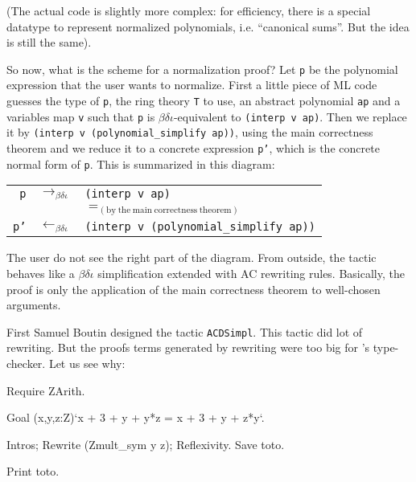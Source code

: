 (The actual code is slightly more complex: for efficiency,
there is a special datatype to represent normalized polynomials,
i.e. ``canonical sums''. But the idea is still the same).

So now, what is the scheme for a normalization proof? Let \texttt{p}
be the polynomial expression that the user wants to normalize. First a
little piece of ML code guesses the type of \texttt{p}, the ring
theory \texttt{T} to use, an abstract polynomial \texttt{ap} and a
variables map \texttt{v} such that \texttt{p} is
$\beta\delta\iota$-equivalent to \verb|(interp v ap)|. Then we
replace it by \verb|(interp v (polynomial_simplify ap))|, using the
main correctness theorem and we reduce it to a concrete expression
\texttt{p'}, which is the concrete normal form of
\texttt{p}. This is summarized in this diagram:

\medskip
\begin{tabular}{rcl}
\texttt{p} & $\rightarrow_{\beta\delta\iota}$  
   & \texttt{(interp v ap)} \\
 & & $=_{\mathrm{(by\ the\ main\ correctness\ theorem)}}$ \\
\texttt{p'} 
   & $\leftarrow_{\beta\delta\iota}$ 
   & \texttt{(interp v (polynomial\_simplify ap))}
\end{tabular}
\medskip

The user do not see the right part of the diagram. 
From outside, the tactic behaves like a
$\beta\delta\iota$ simplification extended with AC rewriting rules.
Basically, the proof is only the application of the main
correctness theorem to well-chosen arguments.


First Samuel Boutin designed the tactic \texttt{ACDSimpl}. 
This tactic did lot of rewriting. But the proofs
terms generated by rewriting were too big for \Coq's type-checker.
Let us see why:

\begin{coq_eval}
Require ZArith.
\end{coq_eval}
\begin{coq_example}
Goal (x,y,z:Z)`x + 3 + y + y*z = x + 3 + y + z*y`.
\end{coq_example}
\begin{coq_example*}
Intros; Rewrite (Zmult_sym y z); Reflexivity. 
Save toto.
\end{coq_example*}
\begin{coq_example}
Print toto.
\end{coq_example}

